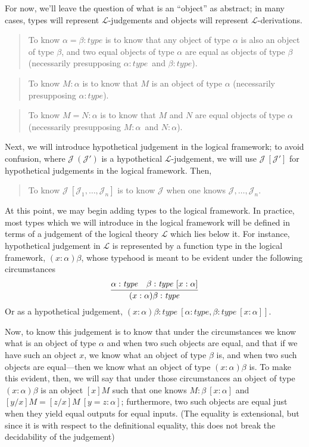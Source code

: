 \documentclass{amsart}
\theoremstyle{definition}
\theoremstyle{remark}
\numberwithin{equation}{section}
\newcommand\hyp[2]{\ensuremath{#1\ (#2)}}
\newcommand\lfhyp[2]{\ensuremath{#1\ [#2]}}
\newcommand\type[1]{\ensuremath{#1:\mathit{type}}}
\begin{document}
For now, we'll leave the question of what is an ``object'' as abstract; in many
cases, types will represent $\mathcal{L}$-judgements and objects will represent
$\mathcal{L}$-derivations.

\begin{quote}
  To know $\type{\alpha=\beta}$ is to know that any object of type $\alpha$ is
  also an object of type $\beta$, and two equal objects of type $\alpha$ are
  equal as objects of type $\beta$ (necessarily presupposing \type\alpha\ and
  \type\beta).
\end{quote}

\begin{quote}
  To know $M:\alpha$ is to know that $M$ is an object of type $\alpha$
  (necessarily presupposing \type\alpha).
\end{quote}

\begin{quote}
  To know $M=N:\alpha$ is to know that $M$ and $N$ are equal objects of type
  $\alpha$ (necessarily presupposing $M:\alpha$\ and $N:\alpha$).
\end{quote}

Next, we will introduce hypothetical judgement in the logical framework; to
avoid confusion, where \hyp{\mathcal{J}}{\mathcal{J}'} is a hypothetical
$\mathcal{L}$-judgement, we will use \lfhyp{\mathcal{J}}{\mathcal{J}'} for
hypothetical judgements in the logical framework. Then,

\begin{quote}
  To know \lfhyp{\mathcal{J}}{\mathcal{J}_1,\dots,\mathcal{J}_n} is to know $\mathcal{J}$ when one knows $\mathcal{J},\dots,\mathcal{J}_n$.
\end{quote}

At this point, we may begin adding types to the logical framework. In practice,
most types which we will introduce in the logical framework will be defined in
terms of a judgement of the logical theory $\mathcal{L}$ which lies below it.
For instance, hypothetical judgement in $\mathcal{L}$ is represented by a
function type in the logical framework, $(x:\alpha)\beta$, whose typehood is
meant to be evident under the following circumstances
\[
  \infer{
    \type{(x:\alpha)\beta}
  }{
    \type\alpha &
    \lfhyp{\type\beta}{x:\alpha}
  }
\]
Or as a hypothetical judgement,
\lfhyp{\type{(x:\alpha)\beta}}{\type\alpha,\lfhyp{\type\beta}{x:\alpha}}.

Now, to know this judgement is to know that under the circumstances we know
what is an object of type $\alpha$ and when two such objects are equal, and
that if we have such an object $x$, we know what an object of type $\beta$ is,
and when two such objects are equal---then we know what an object of type
$(x:\alpha)\beta$ is. To make this evident, then, we will say that under those
circumstances an object of type $(x:\alpha)\beta$ is an object $[x]M$ such that
one knows \lfhyp{M:\beta}{x:\alpha} and \lfhyp{[y/x]M=[z/x]M}{y=z:\alpha};
furthermore, two such objects are equal just when they yield equal outputs for
equal inputs. (The equality is extensional, but since it is with respect to the
definitional equality, this does not break the decidability of the judgement)
\end{document}
